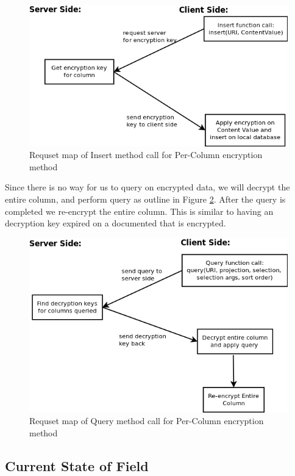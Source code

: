 \begin{figure}[h]
  \centering
  \includegraphics[scale=0.45]{./Figs/col_insert.png}
  \caption
  {Requset map of Insert method call for Per-Column encryption method}
  \label{FigColInsert}
\end{figure}

Since there is no way for us to query on encrypted data, we will decrypt the entire column, and perform query as outline in Figure \ref{FigColQuery}. After the query is completed we re-encrypt the entire column. This is similar to having an decryption key expired on a documented that is encrypted.

\begin{figure}[h]
  \centering
  \includegraphics[scale=0.45]{./Figs/col_query.png}
  \caption
  {Requset map of Query method call for Per-Column encryption method}
  \label{FigColQuery}
\end{figure}

\subsection{Current State of Field}\label{LitRevCurrent}

